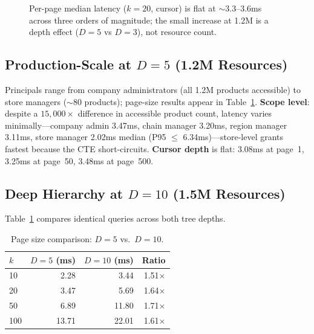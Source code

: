 \documentclass[conference]{IEEEtran}
\begin{document}
\begin{figure}[t]
\centering
{}
\caption{Per-page median latency ($k{=}20$, cursor) is flat at ${\sim}$3.3--3.6ms across three orders of magnitude; the small increase at 1.2M is a depth effect ($D{=}5$ vs $D{=}3$), not resource count.}
\label{fig:scaling}
\end{figure}

\subsection[Production-Scale at D=5 (1.2M Resources)]{Production-Scale at $D{=}5$ (1.2M Resources)}

Principals range from company administrators (all 1.2M products accessible) to store managers (${\sim}$80 products); page-size results appear in Table~\ref{tab:d10}. \textbf{Scope level}: despite a $15{,}000\times$ difference in accessible product count, latency varies minimally---company admin 3.47ms, chain manager 3.20ms, region manager 3.11ms, store manager 2.02ms median (P95 $\leq$ 6.34ms)---store-level grants fastest because the CTE short-circuits. \textbf{Cursor depth} is flat: 3.08ms at page~1, 3.25ms at page~50, 3.48ms at page~500.

\subsection[Deep Hierarchy at D=10 (1.5M Resources)]{Deep Hierarchy at $D{=}10$ (1.5M Resources)}

Table~\ref{tab:d10} compares identical queries across both tree depths.

\begin{table}[t]
\centering
\caption{Page size comparison: $D{=}5$ vs.\ $D{=}10$.}
\label{tab:d10}
\scriptsize
\begin{tabular}{@{}lrrr@{}}
\toprule
$k$ & \textbf{$D{=}5$ (ms)} & \textbf{$D{=}10$ (ms)} & \textbf{Ratio} \\
\midrule
10 & 2.28 & 3.44 & 1.51$\times$ \\
20 & 3.47 & 5.69 & 1.64$\times$ \\
50 & 6.89 & 11.80 & 1.71$\times$ \\
100 & 13.71 & 22.01 & 1.61$\times$ \\
\bottomrule
\end{tabular}
\end{table}
\end{document}
